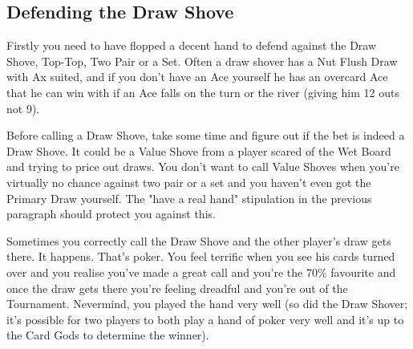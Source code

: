 \subsection{Defending the Draw Shove}

Firstly you need to have flopped a decent hand to defend against
the Draw Shove, Top-Top, Two Pair or a Set. Often a draw shover
has a Nut Flush Draw with Ax suited, and if you don't have an Ace
yourself he has an overcard Ace that he can win with if an Ace
falls on the turn or the river (giving him 12 outs not 9).

Before calling a Draw Shove, take some time and figure out if the
bet is indeed a Draw Shove. It could be a Value Shove from a player
scared of the Wet Board and trying to price out draws. You don't
want to call Value Shoves when you're virtually no chance against
two pair or a set and you haven't even got the Primary Draw yourself.
The "have a real hand" stipulation in the previous paragraph should
protect you against this.

Sometimes you correctly call the Draw Shove and the other player's
draw gets there. It happens. That's poker. You feel terrific when
you see his cards turned over and you realise you've made a great
call and you're the 70\% favourite and once the draw gets there
you're feeling dreadful and you're out of the Tournament. Nevermind,
you played the hand very well (so did the Draw Shover;
it's possible for two players to both play a hand of poker very well
and it's up to the Card Gods to determine the winner).


